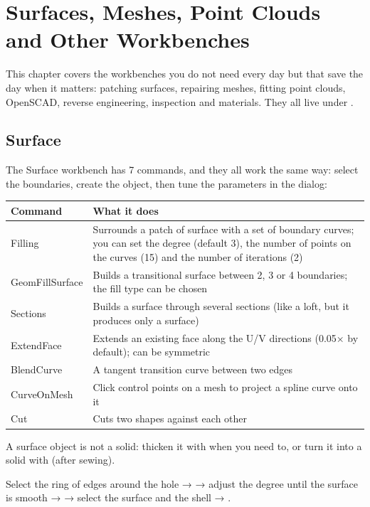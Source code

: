 \chapter{Surfaces, Meshes, Point Clouds and Other Workbenches}

This chapter covers the workbenches you do not need every day but that save the day when it matters:
patching surfaces, repairing meshes, fitting point clouds, OpenSCAD, reverse engineering, inspection
and materials. They all live under .

\section{Surface}

The Surface workbench has 7 commands, and they all work the same way: select the boundaries, create
the object, then tune the parameters in the dialog:

\begin{center}
\small
\begin{tabularx}{\linewidth}{@{}lX@{}}
\toprule
\textbf{Command} & \textbf{What it does} \\
\midrule
Filling & Surrounds a patch of surface with a set of boundary curves; you can set the degree (default 3), the number of points on the curves (15) and the number of iterations (2)\\
GeomFillSurface & Builds a transitional surface between 2, 3 or 4 boundaries; the fill type can be chosen\\
Sections & Builds a surface through several sections (like a loft, but it produces only a surface)\\
ExtendFace & Extends an existing face along the U/V directions (0.05× by default); can be symmetric\\
BlendCurve & A tangent transition curve between two edges\\
CurveOnMesh & Click control points on a mesh to project a spline curve onto it\\
Cut & Cuts two shapes against each other\\
\bottomrule
\end{tabularx}
\end{center}

A surface object is not a solid: thicken it with  when you need to, or turn it
into a solid with  (after sewing).

\begin{practice}
Select the ring of edges around the hole →  → adjust the degree until the surface is
smooth →  → select the surface and the shell → .
\end{practice}

